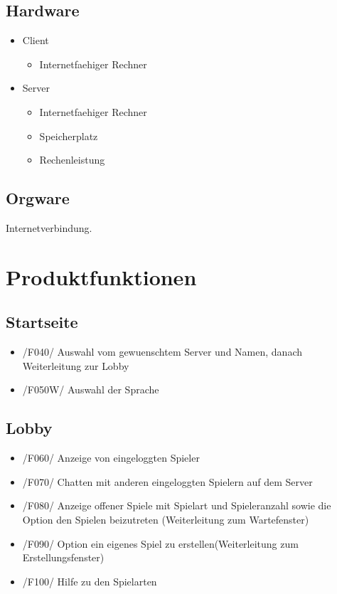 \documentclass{article}
\begin{document}
\subsection{Hardware}
\begin{itemize}
		\item \gls{Client}
		\begin{itemize}
			\item Internetfaehiger Rechner
		\end{itemize}
		\item Server
		\begin{itemize}
			\item Internetfaehiger Rechner	
			\item Speicherplatz
			\item Rechenleistung
		\end{itemize}
	\end{itemize}

\subsection{Orgware}
Internetverbindung.

\section{Produktfunktionen}
\subsection{Startseite}
\begin{itemize}
	\item /F040/ Auswahl vom gewuenschtem \gls{Server} und Namen, danach Weiterleitung zur \gls{Lobby}
	\item /F050W/ Auswahl der Sprache
\end{itemize}

\subsection{\gls{Lobby}}
\begin{itemize}
	\item /F060/ Anzeige von eingeloggten Spieler
	\item /F070/ Chatten mit anderen eingeloggten Spielern auf dem \gls{Server}
	\item /F080/ Anzeige offener Spiele mit Spielart und Spieleranzahl sowie die Option den Spielen beizutreten (Weiterleitung zum Wartefenster)
	\item /F090/ Option ein eigenes Spiel zu erstellen(Weiterleitung zum Erstellungsfenster)
	\item /F100/ Hilfe zu den Spielarten
\end{itemize}
\end{document}
